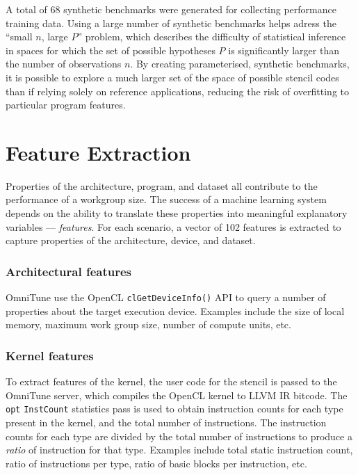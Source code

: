 A total of 68 synthetic benchmarks were generated for collecting
performance training data. Using a large number of synthetic
benchmarks helps adress the ``small $n$, large $P$'' problem, which
describes the difficulty of statistical inference in spaces for which
the set of possible hypotheses $P$ is significantly larger than the
number of observations $n$\CitationNeeded{}. By creating
parameterised, synthetic benchmarks, it is possible to explore a much
larger set of the space of possible stencil codes than if relying
solely on reference applications, reducing the risk of overfitting to
particular program features.


\section{Feature Extraction}

Properties of the architecture, program, and dataset all contribute to
the performance of a workgroup size. The success of a machine learning
system depends on the ability to translate these properties into
meaningful explanatory variables --- \emph{features}. For each
scenario, a vector of 102 features is extracted to capture properties
of the architecture, device, and dataset.


\subsubsection{Architectural features}

OmniTune use the OpenCL \texttt{clGetDeviceInfo()} API to query a
number of properties about the target execution device. Examples
include the size of local memory, maximum work group size, number of
compute units, etc.


\subsubsection{Kernel features}

To extract features of the kernel, the user code for the stencil is
passed to the OmniTune server, which compiles the OpenCL kernel to
LLVM IR bitcode. The \texttt{opt} \texttt{InstCount} statistics pass
is used to obtain instruction counts for each type present in the
kernel, and the total number of instructions. The instruction counts
for each type are divided by the total number of instructions to
produce a \emph{ratio} of instruction for that type. Examples include
total static instruction count, ratio of instructions per type, ratio
of basic blocks per instruction, etc.

